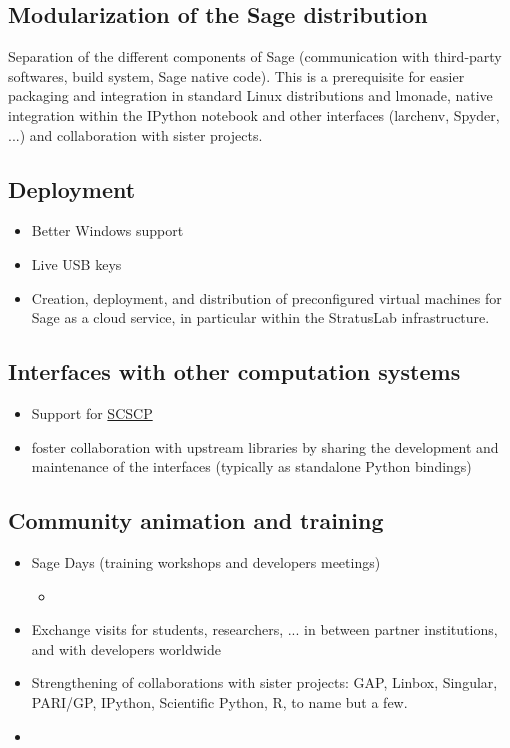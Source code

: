 \subsection{Modularization of the Sage distribution}
Separation of the different components of Sage (communication with
third-party softwares, build system, Sage native code). This is a
prerequisite for easier packaging and integration in standard Linux
distributions and lmonade, native integration within the IPython
notebook and other interfaces (larchenv, Spyder, ...) and
collaboration with sister projects.

\subsection{Deployment}
\begin{itemize}
\item Better Windows support
\item Live USB keys
\item Creation, deployment, and distribution of preconfigured virtual
machines for Sage as a cloud service, in particular within the
StratusLab infrastructure.
\end{itemize}

\subsection{Interfaces with other computation systems}

\begin{itemize}
\item Support for \href{http://www.symbolic-computing.org/}{SCSCP}
\item foster collaboration with upstream libraries by sharing the
  development and maintenance of the interfaces (typically as
  standalone Python bindings)
\end{itemize}


\subsection{Community animation and training}

\begin{itemize}
\item Sage Days (training workshops and developers meetings)
  \begin{itemize}
  \item {}
  \end{itemize}
\item Exchange visits for students, researchers, ... in between
  partner institutions, and with developers worldwide
\item Strengthening of collaborations with sister projects: GAP,
  Linbox, Singular, PARI/GP, IPython, Scientific Python, R, to name but a
  few.
\item {}
\end{itemize}



